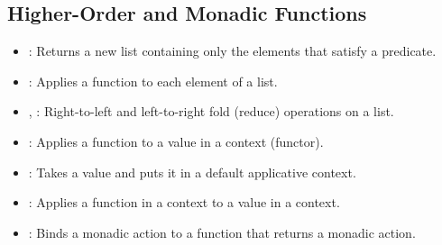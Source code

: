\subsection{Higher-Order and Monadic Functions}
\begin{itemize}
    \item {}: Returns a new list containing only the elements that satisfy a predicate.
    \item {}: Applies a function to each element of a list.
    \item {}, : Right-to-left and left-to-right fold (reduce) operations on a list.
    \item {}: Applies a function to a value in a context (functor).
    \item {}: Takes a value and puts it in a default applicative context.
    \item \code{<*>}: Applies a function in a context to a value in a context.
    \item \code{>>=}: Binds a monadic action to a function that returns a monadic action.
\end{itemize}